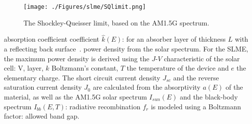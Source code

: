 \begin{refsection}
\begin{figure}[!htp]  
\centering 
\texttt{[image: ./Figures/slme/SQlimit.png]} 
\caption{\label{fig:slme-SQlimit} The Shockley-Queisser limit, based on the 
AM1.5G spectrum.} 
\end{figure} 
 
% 
absorption coefficient 
coefficient $\hat{k}(E)$: 
for an absorber layer of thickness $L$ with a reflecting back 
surface~\cite{Green1981}.  
% 
power density from the solar spectrum. For the SLME, the maximum power density 
is derived using the $J$-$V$ characteristic of the solar cell: 
V, 
layer, $k$ Boltzmann's constant, $T$ the temperature of the device and $e$ the 
elementary charge. The short circuit current density $J_{sc}$ and the reverse 
saturation current density $J_0$ are calculated from the absorptivity $a(E)$ 
of the material, as well as the AM1.5G solar spectrum $I_{sun}(E)$ and the 
black-body spectrum $I_{bb}(E,T)$: 
radiative recombination $f_r$ is modeled using a Boltzmann factor: 
allowed band gap.  
 

\end{refsection}
